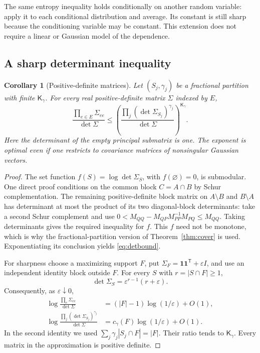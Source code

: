 \documentclass[11pt]{article}
\newtheorem{corollary}[theorem]{Corollary}
\theoremstyle{definition}
\theoremstyle{remark}
\newcommand{\1}{\mathbf 1}
\newcommand{\Kopt}{\mathsf K}
\begin{document}
The same entropy inequality holds conditionally on another random variable:
apply it to each conditional distribution and average. Its constant is still
sharp because the conditioning variable may be constant. This extension does
not require a linear or Gaussian model of the dependence.

\subsection{A sharp determinant inequality}

\begin{corollary}[Positive-definite matrices]
\label{cor:determinants}
Let $(S_j,\gamma_j)$ be a fractional partition with finite $\Kopt_\gamma$.
For every real positive-definite matrix $\Sigma$ indexed by $E$,
\begin{equation}
 \boxed{\displaystyle
 \frac{\prod_{e\in E}\Sigma_{ee}}{\det\Sigma}
 \le
 \left(\frac{\prod_j(\det\Sigma_{S_j})^{\gamma_j}}
 {\det\Sigma}\right)^{\Kopt_\gamma}.}
 \label{eq:detbound}
\end{equation}
Here the determinant of the empty principal submatrix is one. The exponent is
optimal even if one restricts to covariance matrices of nonsingular Gaussian
vectors.
\end{corollary}

\begin{proof}
The set function $f(S)=\log\det\Sigma_S$, with $f(\varnothing)=0$, is
submodular. One direct proof conditions on the common block $C=A\cap B$ by
Schur complementation. The remaining positive-definite block matrix on
$A\setminus B$ and $B\setminus A$ has determinant at most the product of its
two diagonal-block determinants: take a second Schur complement and use
$0<M_{QQ}-M_{QP}M_{PP}^{-1}M_{PQ}\le M_{QQ}$.
Taking determinants gives the required inequality for $f$.
This $f$ need not be monotone, which is why the fractional-partition version of
Theorem~\ref{thm:cover} is used. Exponentiating its conclusion yields
\eqref{eq:detbound}.

For sharpness choose a maximizing support $F$, put
$\Sigma_F=\mathbf 1\mathbf 1^{\mathsf T}+\varepsilon I$, and use an independent
identity block outside $F$. For every $S$ with $r=|S\cap F|\ge1$,
\[
 \det\Sigma_S=\varepsilon^{r-1}(r+\varepsilon).
\]
Consequently, as $\varepsilon\downarrow0$,
\begin{align*}
 \log\frac{\prod_e\Sigma_{ee}}{\det\Sigma}
 &=(|F|-1)\log(1/\varepsilon)+O(1),\\
 \log\frac{\prod_j(\det\Sigma_{S_j})^{\gamma_j}}{\det\Sigma}
 &=c_\gamma(F)\log(1/\varepsilon)+O(1).
\end{align*}
In the second identity we used
$\sum_j\gamma_j|S_j\cap F|=|F|$. Their ratio tends to
$\Kopt_\gamma$. Every matrix in the approximation is positive definite.
\end{proof}
\end{document}
